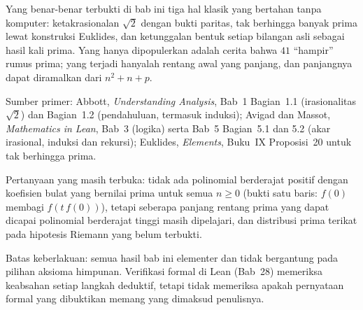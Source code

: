 \begin{untukpeneliti}
Yang benar-benar terbukti di bab ini tiga hal klasik yang bertahan tanpa komputer:
ketakrasionalan $\sqrt{2}$ dengan bukti paritas, tak berhingga banyak prima lewat
konstruksi Euklides, dan ketunggalan bentuk setiap bilangan asli sebagai hasil kali prima.
Yang hanya dipopulerkan adalah cerita bahwa $41$ ``hampir'' rumus prima; yang terjadi
hanyalah rentang awal yang panjang, dan panjangnya dapat diramalkan dari $n^{2}+n+p$.

Sumber primer: Abbott, \emph{Understanding Analysis}, Bab~1 Bagian~1.1 (irasionalitas
$\sqrt{2}$) dan Bagian~1.2 (pendahuluan, termasuk induksi); Avigad dan Massot,
\emph{Mathematics in Lean}, Bab~3 (logika) serta Bab~5 Bagian~5.1 dan 5.2
(akar irasional, induksi dan rekursi); Euklides, \emph{Elements}, Buku~IX
Proposisi~20 untuk tak berhingga prima.

Pertanyaan yang masih terbuka: tidak ada polinomial berderajat positif dengan koefisien
bulat yang bernilai prima untuk semua $n \geq 0$ (bukti satu baris: $f(0)$ membagi
$f(t\,f(0))$), tetapi seberapa panjang rentang prima yang dapat dicapai polinomial
berderajat tinggi masih dipelajari, dan distribusi prima terikat pada hipotesis Riemann
yang belum terbukti.

Batas keberlakuan: semua hasil bab ini elementer dan tidak bergantung pada pilihan aksioma
himpunan. Verifikasi formal di Lean (Bab~28) memeriksa keabsahan setiap langkah deduktif,
tetapi tidak memeriksa apakah pernyataan formal yang dibuktikan memang yang dimaksud
penulisnya.
\end{untukpeneliti}

